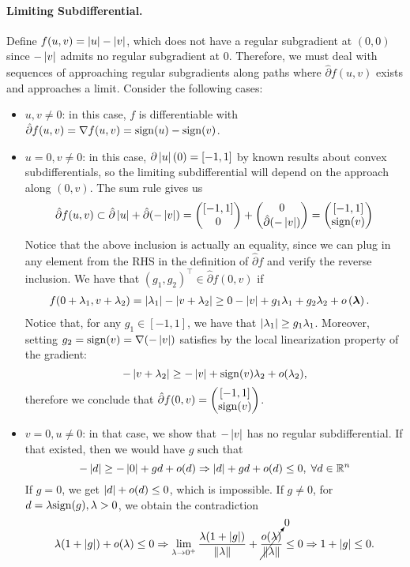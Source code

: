 \documentclass[10pt]{article}
\newcommand{\regdiff}{\hat{\partial}}
\begin{document}
\paragraph{Limiting Subdifferential.}
Define $f(u, v) = \left| u \right| - \left| v \right|$, which does not have a regular subgradient
at $(0, 0)$ since $-\left| v \right|$ admits no regular subgradient at $0$. Therefore, we
must deal with sequences of approaching regular subgradients along paths where
$\regdiff f(u, v)$ exists and approaches a limit. Consider the following cases:
\begin{itemize}
\item $u, v \neq 0$: in this case, $f$ is differentiable with $\regdiff f (u,
v) = \grad f (u, v) = \sign(u) - \sign(v)$.
\item $u = 0, v \neq 0$: in this case, $\partial \left| u \right|(0)= [-1, 1]$ by known
results about convex subdifferentials, so the limiting subdifferential will
depend on the approach along $(0, v)$. The sum rule gives us
\[
    \regdiff f(u, v) \subset \regdiff \abs{u} + \regdiff (-\abs{v}) =
    \begin{pmatrix} [-1, 1] \\ 0 \end{pmatrix} + \begin{pmatrix}
        0 \\ \regdiff (-\abs{v}) \end{pmatrix} =
    \begin{pmatrix}
        [-1, 1] \\ \sign(v)
    \end{pmatrix}
\]
Notice that the above inclusion is actually an equality, since we can plug in
any element from the RHS in the definition of $\regdiff f$ and verify the
reverse inclusion. We have that $(g_1, g_2)^\top \in \regdiff f(0, v)$ if
\begin{align*}
    f(0 + \lambda_1, v + \lambda_2) &=
        \left| \lambda_1 \right| - \left| v + \lambda_2 \right| \geq
        0 - \left| v \right| + g_1 \lambda_1 + g_2 \lambda_2 + o\left(
        \bm{\lambda}\right).
\end{align*}
Notice that, for any $g_1 \in [-1, 1]$, we have that $\left| \lambda_1 \right| \geq g_1
\lambda_1$. Moreover, setting $g_2 = \mathrm{sign}(v) = \nabla (-\left| v \right|)$ satisfies by
the local linearization property of the gradient:
\[
    -\left| v + \lambda_2 \right| \geq -\left| v \right| + \mathrm{sign}(v) \lambda_2 + o(\lambda_2),
\]
therefore we conclude that $\regdiff f(0, v) = \pmx{[-1, 1] \\ \sign(v)}$.
\item $v = 0, u \neq 0$: in that case, we show that $-\left| v \right|$ has no regular
subdifferential. If that existed, then we would have $g$ such that
\[
    -\left| d \right| \geq -\left| 0 \right| + g d + o(d) \Rightarrow \left| d \right| + g d + o(d) \leq 0,
    \; \forall d \in \mathbb{R}^n
\]
If $g = 0$, we get $\left| d \right| + o(d) \leq 0$, which is impossible. If $g \neq 0$,
for $d = \lambda \mathrm{sign}(g), \lambda > 0$, we obtain the contradiction
\[
    \lambda (1 + \left| g \right|) + o(\lambda) \leq 0 \Rightarrow
    \lim_{\lambda \to 0^+} \frac{\lambda (1 + \left| g \right|)}{\left \| \lambda \right \|}
    + \cancelto{0}{\frac{o(\lambda)}{\left \| \lambda \right \|}} \leq 0 \Rightarrow
    1 + \left| g \right| \leq 0.
\]
\end{itemize}
\end{document}
